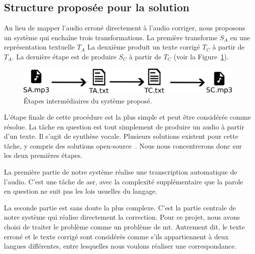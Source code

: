 \subsection{Structure proposée pour la solution}

Au lieu de mapper l'audio erroné directement à l'audio corriger,
nous proposons un système qui enchaîne trois transformations.
La première transforme \(S_A\) en une représentation textuelle \(T_A\)
La deuxième produit un texte corrigé \(T_C\) à partir de \(T_A\).
La dernière étape est de produire \(S_C\) à partir de \(T_C\) (voir la Figure~\ref{fig.detail-system}).

\begin{figure}[hbt]
    \centering
    \includegraphics[width=\linewidth]{assets/images/detail.png}
    \caption{Étapes intermédiaires du système proposé.}
    \label{fig.detail-system}
\end{figure}

L'étape finale de cette procédure est la plus simple et peut être considérée comme résolue.
La tâche en question est tout simplement de produire un audio à partir d'un texte.
Il s'agit de synthèse vocale.
Plusieurs solutions existent pour cette tâche, y compris des solutions open-source~\cite{Tan_et_al._2022}.
Nous nous concentrerons donc sur les deux premières étapes.

La première partie de notre système réalise une transcription automatique de l'audio.
C'est une tâche de \gls{asr}, 
avec la complexité supplémentaire que la parole en question ne suit pas les lois usuelles du langage.

La seconde partie est sans doute la plus complexe.
C'est la partie centrale de notre système qui réalise directement la correction.
Pour ce projet, nous avons choisi de traiter le problème comme un problème de \gls{mt}.
Autrement dit, le texte erroné et le texte corrigé 
sont considérés comme s'ils appartiennent à deux langues différentes,
entre lesquelles nous voulons réaliser une correspondance.
